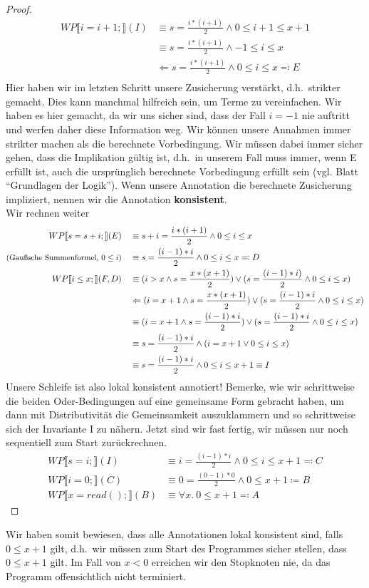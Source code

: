 \documentclass[hidelinks]{article}
\theoremstyle{plain}
\theoremstyle{definition}
\theoremstyle{rem}
\begin{document}
\begin{sloppypar}
\begin{proof}
\begin{align*}
WP\llbracket i=i+1;\rrbracket(I)&\equiv s=\frac{i*(i+1)}{2}\wedge 0\le i+1\le x+1\\
&\equiv s=\frac{i*(i+1)}{2}\wedge -1\le i\le x\\
&\Leftarrow s=\frac{i*(i+1)}{2}\wedge 0\le i\le x\eqqcolon E\\
\end{align*}
Hier haben wir im letzten Schritt unsere Zusicherung verstärkt, d.h.\ strikter gemacht. Dies kann manchmal hilfreich sein, um Terme zu vereinfachen. Wir haben es hier gemacht, da wir uns sicher sind, dass der Fall $i=-1$ nie auftritt und werfen daher diese Information weg. Wir können unsere Annahmen immer strikter machen als die berechnete Vorbedingung. Wir müssen dabei immer sicher gehen, dass die Implikation gültig ist, d.h.\ in unserem Fall muss immer, wenn E erfüllt ist, auch die ursprünglich berechnete Vorbedingung erfüllt sein (vgl. Blatt ``Grundlagen der Logik''). Wenn unsere Annotation die berechnete Zusicherung impliziert, nennen wir die Annotation \textbf{konsistent}.\\
Wir rechnen weiter
\begin{align*}
WP\llbracket s=s+i;\rrbracket(E)\quad&\equiv s+i=\frac{i*(i+1)}{2}\wedge 0\le i\le x\\
\text{\small{(Gaußsche Summenformel, $0\le i$)}}\quad&\equiv s=\frac{(i-1)*i}{2}\wedge 0\le i\le x\eqqcolon D\\
WP\llbracket i\le x;\rrbracket(F,D)\quad&\equiv (i>x \wedge s=\frac{x*(x+1)}{2})\vee (s=\frac{(i-1)*i)}{2}\wedge 0\le i\le x)\\
&\Leftarrow (i=x+1 \wedge s=\frac{x*(x+1)}{2})\vee (s=\frac{(i-1)*i}{2}\wedge 0\le i\le x)\\
&\equiv (i=x+1 \wedge s=\frac{(i-1)*i}{2})\vee (s=\frac{(i-1)*i}{2}\wedge 0\le i\le x)\\
&\equiv s=\frac{(i-1)*i}{2}\wedge(i=x+1 \vee 0\le i\le x)\\
&\equiv s=\frac{(i-1)*i}{2}\wedge 0\le i\le x+1\equiv I
\end{align*}
Unsere Schleife ist also lokal konsistent annotiert! Bemerke, wie wir schrittweise die beiden Oder-Bedingungen auf eine gemeinsame Form gebracht haben, um dann mit Distributivität die Gemeinsamkeit auszuklammern und so schrittweise sich der Invariante I zu nähern. Jetzt sind wir fast fertig, wir müssen nur noch sequentiell zum Start zurückrechnen.
\begin{align*}
WP\llbracket s=i;\rrbracket(I)&\equiv i=\frac{(i-1)*i}{2}\wedge 0\le i\le x+1\eqqcolon C\\
WP\llbracket i=0;\rrbracket(C)&\equiv 0=\frac{(0-1)*0}{2}\wedge 0\le x+1\coloneqq B\\
WP\llbracket x=read();\rrbracket(B)&\equiv \forall x.\ 0\le x+1\eqqcolon A
\end{align*}
\end{proof}
Wir haben somit bewiesen, dass alle Annotationen lokal konsistent sind, falls $0\le x+1$ gilt, d.h.\ wir müssen zum Start des Programmes sicher stellen, dass $0\le x+1$ gilt. Im Fall von $x<0$ erreichen wir den Stopknoten nie, da das Programm offensichtlich nicht terminiert.

\end{sloppypar}
\end{document}

